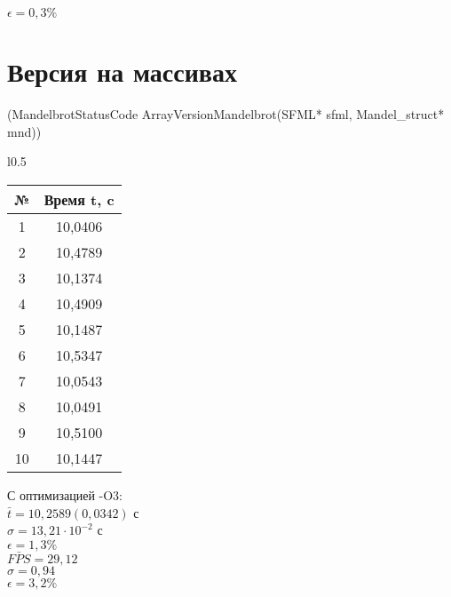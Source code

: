 \documentclass[12pt, letterpaper]{article}
\begin{document}
    $\epsilon = 0,3\%$\\

    \newpage
    \section{Версия на массивах} (MandelbrotStatusCode ArrayVersionMandelbrot(SFML* sfml, Mandel\_struct* mnd))
    
    \begin{wraptable}{l}{0.5\textwidth}
        \begin{tabular}{cc} 
        \toprule             %
        \textbf{№} & \textbf{Время t, c} \\
        \midrule             %
        1 & 10,0406 \\
        2 & 10,4789 \\
        3 & 10,1374 \\
        4 & 10,4909 \\
        5 & 10,1487 \\
        6 & 10,5347 \\
        7 & 10,0543 \\
        8 & 10,0491 \\
        9 & 10,5100 \\
        10 & 10,1447 \\
        \bottomrule          %
        \end{tabular}
    \end{wraptable}
    
     С оптимизацией -O3:\\                 

    $\bar{t} = 10,2589 (0,0342)$ с\\

    $\sigma = 13,21 \cdot 10^{-2}$ с\\
    
    $\epsilon = 1,3\%$\\
        
    $\bar{FPS} = 29,12$\\

    $\sigma = 0,94$\\

    $\epsilon = 3,2\%$\\
    
\end{document}
